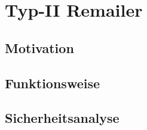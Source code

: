 \chapter{Typ-II Remailer}
\section{Motivation}

\section{Funktionsweise}

\section{Sicherheitsanalyse}